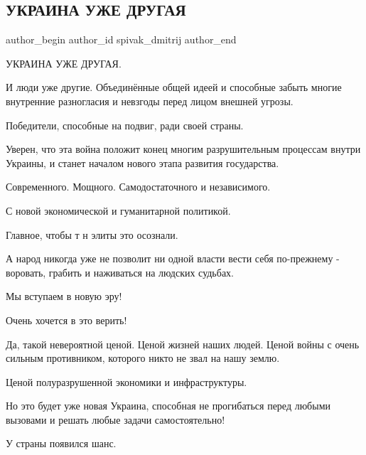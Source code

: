  
 
 
 
 
 
\subsection{УКРАИНА УЖЕ ДРУГАЯ}
\label{sec:26_02_2022.fb.spivak_dmitrij.1.ukraina_uzhe_drugaja}
 
\ifcmt
 author_begin
   author_id spivak_dmitrij
 author_end
\fi

УКРАИНА УЖЕ ДРУГАЯ.

И люди уже другие. Объединённые общей идеей и способные забыть многие
внутренние разногласия и невзгоды перед лицом внешней угрозы. 

Победители, способные на подвиг, ради своей страны. 

Уверен, что эта война положит конец многим разрушительным процессам  внутри
Украины, и станет началом нового этапа развития государства. 

Современного. Мощного. Самодостаточного и независимого. 

С новой экономической и гуманитарной политикой. 

Главное, чтобы т н элиты это осознали. 

А народ никогда уже не позволит ни одной власти вести себя по-прежнему -
воровать, грабить и наживаться на людских судьбах. 

Мы вступаем в новую эру! 

Очень хочется в это верить! 

Да, такой невероятной  ценой. Ценой жизней наших людей. Ценой войны с очень
сильным противником, которого никто не звал на нашу землю. 

Ценой полуразрушенной экономики и инфраструктуры.

Но это будет уже новая Украина, способная не прогибаться перед любыми вызовами
и решать любые задачи самостоятельно!

У страны появился шанс.
